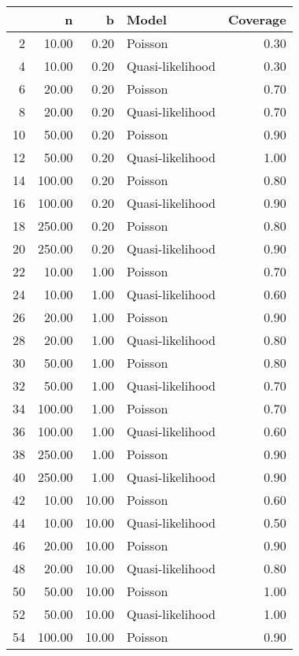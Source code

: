 \begin{table}[ht]
\centering
\begin{tabular}{rrrlr}
  \hline
 & n & b & Model & Coverage \\ 
  \hline
2 & 10.00 & 0.20 & Poisson & 0.30 \\ 
  4 & 10.00 & 0.20 & Quasi-likelihood & 0.30 \\ 
  6 & 20.00 & 0.20 & Poisson & 0.70 \\ 
  8 & 20.00 & 0.20 & Quasi-likelihood & 0.70 \\ 
  10 & 50.00 & 0.20 & Poisson & 0.90 \\ 
  12 & 50.00 & 0.20 & Quasi-likelihood & 1.00 \\ 
  14 & 100.00 & 0.20 & Poisson & 0.80 \\ 
  16 & 100.00 & 0.20 & Quasi-likelihood & 0.90 \\ 
  18 & 250.00 & 0.20 & Poisson & 0.80 \\ 
  20 & 250.00 & 0.20 & Quasi-likelihood & 0.90 \\ 
  22 & 10.00 & 1.00 & Poisson & 0.70 \\ 
  24 & 10.00 & 1.00 & Quasi-likelihood & 0.60 \\ 
  26 & 20.00 & 1.00 & Poisson & 0.90 \\ 
  28 & 20.00 & 1.00 & Quasi-likelihood & 0.80 \\ 
  30 & 50.00 & 1.00 & Poisson & 0.80 \\ 
  32 & 50.00 & 1.00 & Quasi-likelihood & 0.70 \\ 
  34 & 100.00 & 1.00 & Poisson & 0.70 \\ 
  36 & 100.00 & 1.00 & Quasi-likelihood & 0.60 \\ 
  38 & 250.00 & 1.00 & Poisson & 0.90 \\ 
  40 & 250.00 & 1.00 & Quasi-likelihood & 0.90 \\ 
  42 & 10.00 & 10.00 & Poisson & 0.60 \\ 
  44 & 10.00 & 10.00 & Quasi-likelihood & 0.50 \\ 
  46 & 20.00 & 10.00 & Poisson & 0.90 \\ 
  48 & 20.00 & 10.00 & Quasi-likelihood & 0.80 \\ 
  50 & 50.00 & 10.00 & Poisson & 1.00 \\ 
  52 & 50.00 & 10.00 & Quasi-likelihood & 1.00 \\ 
  54 & 100.00 & 10.00 & Poisson & 0.90 \\ 

\end{tabular}
\end{table}
